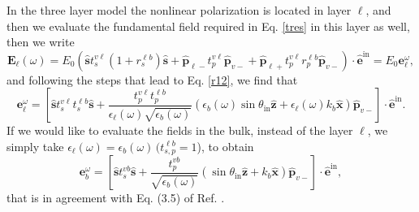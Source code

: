 In the three layer model the nonlinear polarization is located in layer $\ell$,
and then we evaluate the fundamental field required in Eq. \eqref{tres} in this
layer as well, then we write
\begin{equation}\label{m2}
\mathbf{E}_{\ell}(\omega)=E_0\left(
\hat{\mathbf{s}} t^{v\ell}_s(1+r^{\ell b}_s)\hat{\mathbf{s}}
+
\hat{\mathbf{p}}_{\ell-}
 t^{v\ell}_{p}
\hat{\mathbf{p}}_{v-}
+
\hat{\mathbf{p}}_{\ell+}
t^{v\ell}_{p}r^{\ell b}_{p}
\hat{\mathbf{p}}_{v-}
\right)\cdot\hat{\mathbf{e}}^{\mathrm{in}}=E_0\mathbf{e}^\omega_{\ell}
,
\end{equation} 
and following the steps that lead to Eq. \eqref{r12}, we find that
\begin{equation}\label{m12}
\mathbf{e}^{\omega}_{\ell}
= \left[
\hat{\mathbf{s}}t_{s}^{v\ell}t_{s}^{\ell b}\hat{\mathbf{s}} 
+ \frac{t^{v\ell}_{p}t^{\ell b}_{p}}
       {\epsilon_{\ell}(\omega)\sqrt{\epsilon_{b}(\omega)}}
\left(
  \epsilon_{b}(\omega)\sin\theta_{\mathrm{in}}\hat{\mathbf{z}}
+ \epsilon_{\ell}(\omega)k_{b}\hat{\mathbf{x}}
\right)
\hat{\mathbf{p}}_{v-}
\right]
\cdot\hat{\mathbf{e}}^{\mathrm{in}}.  
\end{equation}  
If we would like to evaluate the fields in the bulk, instead of the layer
$\ell$, we simply take $\epsilon_{\ell}(\omega)=\epsilon_{b}(\omega)\,(t^{\ell
b}_{s,p}=1$), to obtain
\begin{equation}\label{m13}
\mathbf{e}^{\omega}_{b}
= \left[
\hat{\mathbf{s}}t_{s}^{vb}\hat{\mathbf{s}}
+ \frac{t^{vb}_{p}}{\sqrt{\epsilon_{b}(\omega)}}
\left(
\sin\theta_{\mathrm{in}}\hat{\mathbf{z}} + k_{b}\hat{\mathbf{x}}
\right) 
\hat{\mathbf{p}}_{v-}
\right]
\cdot\hat{\mathbf{e}}^{\mathrm{in}},  
\end{equation} 
that is in agreement with Eq. (3.5) of Ref. \cite{mizrahiJOSA88}.

